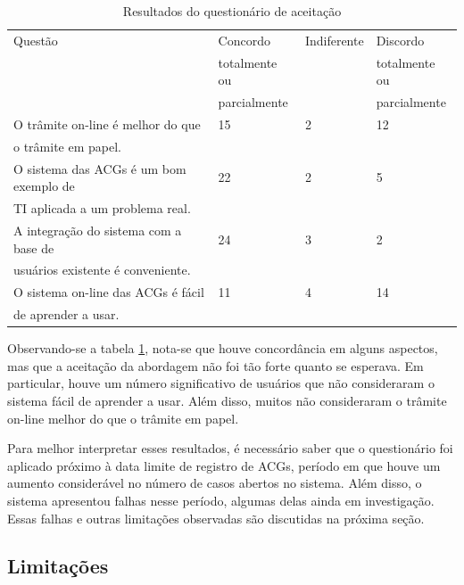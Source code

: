 \documentclass[12pt]{article}
\begin{document}
\begin{table}[hpbt]
    \caption{Resultados do questionário de aceitação}\label{t:aceitacao}
    \begin{tabular}{l|l|l|l}
        \hline
Questão  & Concordo  & Indiferente & Discordo \\
         & totalmente ou    &             &  totalmente ou \\
         & parcialmente     &             &  parcialmente \\
\hline
O trâmite on-line é melhor do que & 15 & 2 & 12 \\
o trâmite em papel. & & &\\
\hline
O sistema das ACGs é um bom exemplo de & 22   & 2  & 5 \\
TI aplicada a um problema real. & & &\\
\hline
 A integração do sistema com a base de  & 24 & 3  & 2      \\
usuários existente é conveniente. & & &\\
\hline
 O sistema on-line das ACGs é fácil &  11 & 4  & 14                  \\
de aprender a usar.   &  & &\\
        \hline
    \end{tabular}
\end{table}

Observando-se a tabela \ref{t:aceitacao}, nota-se que houve concordância em alguns aspectos, mas que a aceitação da abordagem não foi tão forte quanto se esperava. Em particular, houve um número significativo de usuários que não consideraram o sistema fácil de aprender a usar. Além disso, muitos não consideraram o trâmite on-line melhor do que o trâmite em papel.

Para melhor interpretar esses resultados, é necessário saber que o questionário foi aplicado próximo à data limite de registro de ACGs, período em que houve um aumento considerável no número de casos abertos no sistema. Além disso, o sistema apresentou falhas nesse período, algumas delas ainda em investigação. Essas falhas e outras limitações observadas são discutidas na próxima seção.

\subsection{Limitações}
\end{document}
